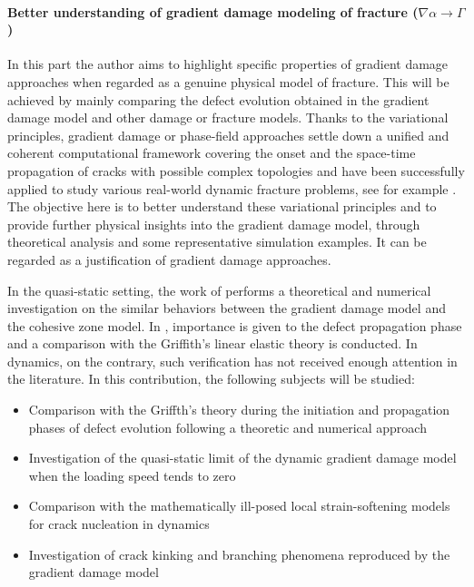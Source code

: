 \paragraph{Better understanding of gradient damage modeling of fracture ($\nabla\alpha\to\Gamma$)} In this part the author aims to highlight specific properties of gradient damage approaches when regarded as a genuine physical model of fracture. This will be achieved by mainly comparing the defect evolution obtained in the gradient damage model and other damage or fracture models. Thanks to the variational principles, gradient damage or phase-field approaches settle down a unified and coherent computational framework covering the onset and the space-time propagation of cracks with possible complex topologies and have been successfully applied to study various real-world dynamic fracture problems, see for example \cite{HofackerMiehe:2012,BordenVerhooselScottHughesLandis:2012,SchlueterWillenbuecherKuhnMueller:2014,DallyWeinberg:2015}. The objective here is to better understand these variational principles and to provide further physical insights into the gradient damage model, through theoretical analysis and some representative simulation examples. It can be regarded as a justification of gradient damage approaches.

In the quasi-static setting, the work of \cite{LorentzCuvilliezKazymyrenko:2011,LorentzCuvilliezKazymyrenko:2012} performs a theoretical and numerical investigation on the similar behaviors between the gradient damage model and the cohesive zone model. In \cite{SicsicMarigo:2013,HossainHsuehBourdinBhattachary:2014,KlinsmannRosatoKamlahMcMeeking:2015}, importance is given to the defect propagation phase and a comparison with the Griffith's linear elastic theory is conducted. In dynamics, on the contrary, such verification has not received enough attention in the literature. In this contribution, the following subjects will be studied:
\begin{itemize}
\item Comparison with the Griffth's theory during the initiation and propagation phases of defect evolution following a theoretic and numerical approach

\item Investigation of the quasi-static limit of the dynamic gradient damage model when the loading speed tends to zero

\item Comparison with the mathematically ill-posed local strain-softening models for crack nucleation in dynamics

\item Investigation of crack kinking and branching phenomena reproduced by the gradient damage model
\end{itemize}

